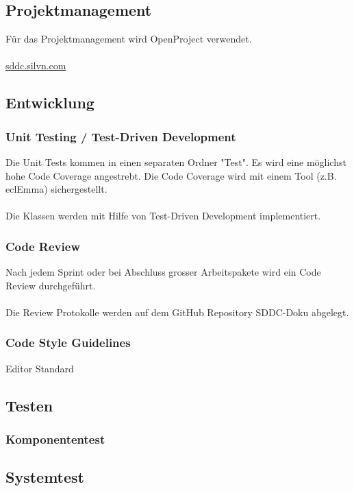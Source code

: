\documentclass[11pt]{scrartcl}
\begin{document}
\subsection{Projektmanagement}
Für das Projektmanagement wird OpenProject verwendet.\\
\\
\url{sddc.silvn.com}


\subsection{Entwicklung}
\subsubsection{Unit Testing / Test-Driven Development}
Die Unit Tests kommen in einen separaten Ordner "Test".
Es wird eine möglichst hohe Code Coverage angestrebt.
Die Code Coverage wird mit einem Tool (z.B. eclEmma) sichergestellt.\\
\\
Die Klassen werden mit Hilfe von Test-Driven Development implementiert.

\subsubsection{Code Review}
Nach jedem Sprint oder bei Abschluss grosser Arbeitspakete wird ein Code Review durchgeführt.\\
\\
Die Review Protokolle werden auf dem GitHub Repository SDDC-Doku abgelegt.

\subsubsection{Code Style Guidelines}
Editor Standard





\subsection{Testen}

\subsubsection{Komponententest}

\subsection{Systemtest}
\end{document}
